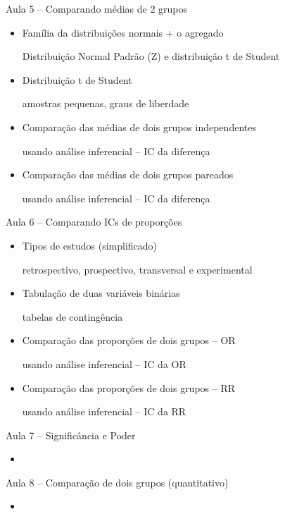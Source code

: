 \documentclass{beamer}
\begin{document}
\begin{frame}{\scriptsize Aula 5 -- Comparando médias de 2 grupos}
  \begin{itemize}
    \footnotesize
  \item Família da distribuições normais + o agregado

    {\tiny Distribuição Normal Padrão (Z) e distribuição t de Student}
    \bigskip
  \item Distribuição t de Student

    {\tiny amostras pequenas, graus de liberdade}
    \bigskip
  \item Comparação das médias de dois grupos independentes

    {\tiny usando análise inferencial -- IC da diferença}
    \bigskip
  \item Comparação das médias de dois grupos pareados

    {\tiny usando análise inferencial -- IC da diferença}
  \end{itemize}
\end{frame}

\begin{frame}{\scriptsize Aula 6 -- Comparando ICs de proporções}
  \begin{itemize}
    \footnotesize
  \item Tipos de estudos (simplificado)

    {\tiny retrospectivo, prospectivo, transversal e experimental}
    \bigskip
  \item Tabulação de duas variáveis binárias

    {\tiny tabelas de contingência}
    \bigskip
  \item Comparação das proporções de dois grupos -- OR

    {\tiny usando análise inferencial -- IC da OR}
    \bigskip
  \item Comparação das proporções de dois grupos -- RR

    {\tiny usando análise inferencial -- IC da RR}
  \end{itemize}
\end{frame}

\begin{frame}{\scriptsize Aula 7 -- Significância e Poder}
  \begin{itemize}
  \item 
  \end{itemize}
\end{frame}

\begin{frame}{\scriptsize Aula 8 -- Comparação de dois grupos (quantitativo)}
  \begin{itemize}
  \item 
  \end{itemize}
\end{frame}
\end{document}

